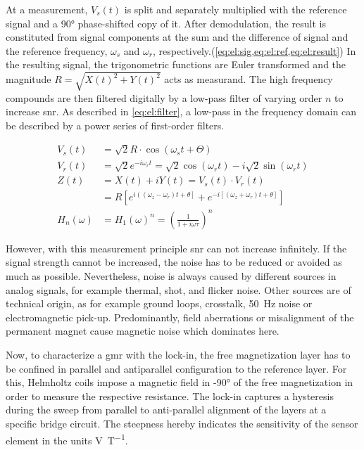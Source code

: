 At a measurement, $V_s(t)$ is split and separately multiplied with the reference signal and a \ang{90} phase-shifted copy of it. After demodulation, the result is constituted from signal components at the sum and the difference of signal and the reference frequency, $\omega_{s}$ and $\omega_{r}$, respectively.(\cref{eq:el:sig,eq:el:ref,eq:el:result}) In the resulting signal, the trigonometric functions are Euler transformed and the magnitude $R=\sqrt{X(t)^2+Y(t)^2}$ acts as measurand. The high frequency compounds are then filtered digitally by a low-pass filter of varying order $n$ to increase \gls{snr}. As described in \cref{eq:el:filter}, a low-pass in the frequency domain can be described by a power series of first-order filters.

\begin{align}
		V_{s}(t) &=\sqrt{2} R \cdot \cos \left(\omega_{s} t+\Theta\right) \label{eq:el:sig} \\
	V_{r}(t)&=\sqrt{2} e^{-i \omega_{r} t}=\sqrt{2} \cos \left(\omega_{r} t\right)-i \sqrt{2} \sin \left(\omega_{r} t\right) \label{eq:el:ref}\\
	Z(t) &=X(t)+i Y(t)=V_{s}(t) \cdot V_{r}(t) \label{eq:el:result} \\
		&=R\left[e^{i\left(\left(\omega_{z}-\omega_{r}\right) t+\theta\right]}+e^{-i\left[\left(\omega_{z}+\omega_{r}\right) t+\theta\right]}\right] \\
		H_{n}(\omega)&=H_{1}(\omega)^{n}=\left(\frac{1}{1+i \omega \tau}\right)^{n} \label{eq:el:filter}
\end{align}


However, with this measurement principle \gls{snr} can not increase infinitely. If the signal strength cannot be increased, the noise  has to be reduced or avoided as much as possible. Nevertheless, noise is always caused by different sources in analog signals, for example thermal, shot, and flicker noise. Other sources are of technical origin, as for example ground loops, crosstalk, \SI{50}{\hertz} noise or electromagnetic pick-up. Predominantly, field aberrations or misalignment of the permanent magnet cause magnetic noise which dominates here.\cite{lit:nano:lockin}

Now, to characterize a \gls{gmr} with the lock-in, the free magnetization layer has to be confined in parallel and antiparallel configuration to the reference layer. For this, Helmholtz coils impose a magnetic field in \ang{+-90} of the free magnetization in order to measure the respective resistance. The lock-in captures a hysteresis during the sweep from parallel to anti-parallel alignment of the layers at a specific bridge circuit. The steepness hereby indicates the sensitivity of the sensor element in the units \si{\volt\per\tesla}.




